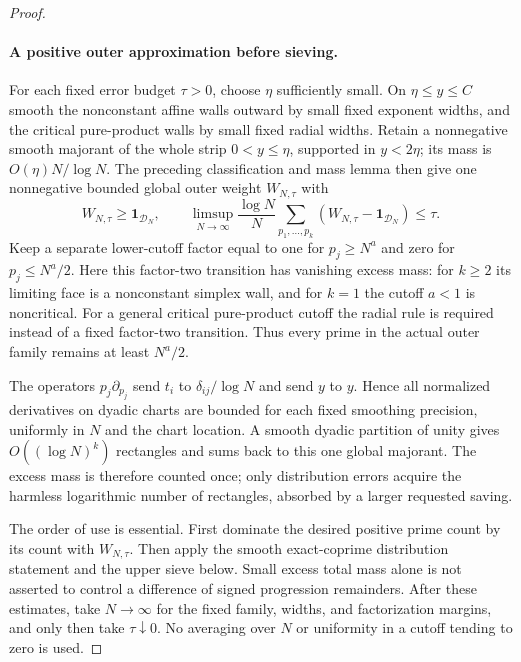 \documentclass[11pt]{article}
\begin{document}
\begin{proof}
\paragraph{A positive outer approximation before sieving.}
For each fixed error budget $\tau>0$, choose $\eta$ sufficiently
small. On $\eta\le y\le C$ smooth the nonconstant affine walls
outward by small fixed exponent widths, and the critical pure-product
walls by small fixed radial widths. Retain a nonnegative smooth
majorant of the whole strip $0<y\le\eta$, supported in $y<2\eta$;
its mass is $O(\eta)N/\log N$. The preceding classification and
mass lemma then give one nonnegative bounded global outer weight
$W_{N,\tau}$ with
\[
 W_{N,\tau}\ge\mathbf1_{\mathcal D_N},\qquad
 \limsup_{N\to\infty}\frac{\log N}{N}
       \sum_{p_1,\ldots,p_k}
        (W_{N,\tau}-\mathbf1_{\mathcal D_N})\le\tau.
\]
Keep a separate lower-cutoff factor equal to one for $p_j\ge N^a$
and zero for $p_j\le N^a/2$. Here this factor-two transition has
vanishing excess mass: for $k\ge2$ its limiting face is a
nonconstant simplex wall, and for $k=1$ the cutoff $a<1$ is
noncritical. For a general critical pure-product cutoff the radial
rule is required instead of a fixed factor-two transition.
Thus every prime in the actual outer family remains at least $N^a/2$.

The operators $p_j\partial_{p_j}$ send $t_i$ to
$\delta_{ij}/\log N$ and send $y$ to $y$. Hence all normalized
derivatives on dyadic charts are bounded for each fixed smoothing
precision, uniformly in $N$ and the chart location. A smooth dyadic
partition of unity gives $O((\log N)^k)$ rectangles and sums back
to this one global majorant. The excess mass is therefore counted
once; only distribution errors acquire the harmless logarithmic
number of rectangles, absorbed by a larger requested saving.

The order of use is essential. First dominate the desired positive
prime count by its count with $W_{N,\tau}$. Then apply the smooth
exact-coprime distribution statement and the upper sieve below.
Small excess total mass alone is not asserted to control a difference
of signed progression remainders. After these estimates, take
$N\to\infty$ for the fixed family, widths, and factorization margins,
and only then take $\tau\downarrow0$. No averaging over $N$ or
uniformity in a cutoff tending to zero is used.


\end{proof}
\end{document}
